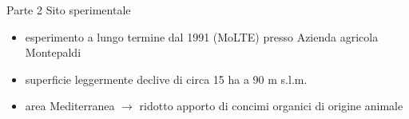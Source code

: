 \documentclass[xcolor={usenames, table, x11names}, final, 10pt]{beamer}
\begin{document}
\begin{frame}{Parte 2 \small{Sito sperimentale}}
  \begin{overlayarea}{\textwidth}{0.20\textheight}
    \begin{itemize}[<+->]
    \item esperimento a lungo termine dal 1991 (MoLTE) presso Azienda
      agricola Montepaldi
    \item superficie leggermente declive di circa 15 ha a 90
      m s.l.m.
    \item area Mediterranea $\rightarrow$ ridotto apporto di concimi
      organici di origine animale
    \end{itemize}
  \end{overlayarea}
  \vfill
  \begin{overlayarea}{\textwidth}{0.45\textheight}

  \end{overlayarea}  
\end{frame}
\end{document}
